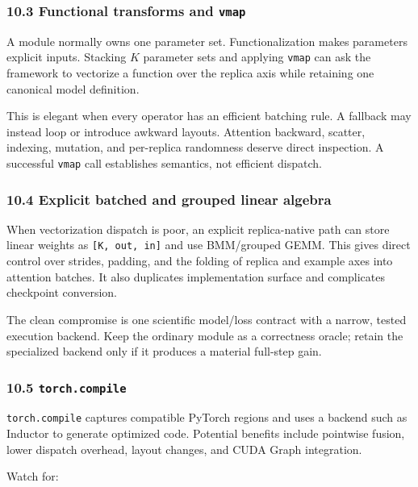 \documentclass[
  10pt,
  letterpaper,
]{article}
\begin{document}
\subsubsection{\texorpdfstring{10.3 Functional transforms and
\texttt{vmap}}{10.3 Functional transforms and vmap}}\label{103-functional-transforms-and-vmap}

A module normally owns one parameter set. Functionalization makes
parameters explicit inputs. Stacking \(K\) parameter sets and applying
\texttt{vmap} can ask the framework to vectorize a function over the
replica axis while retaining one canonical model definition.

This is elegant when every operator has an efficient batching rule. A
fallback may instead loop or introduce awkward layouts. Attention
backward, scatter, indexing, mutation, and per-replica randomness
deserve direct inspection. A successful \texttt{vmap} call establishes
semantics, not efficient dispatch.

\subsubsection{10.4 Explicit batched and grouped linear
algebra}\label{104-explicit-batched-and-grouped-linear-algebra}

When vectorization dispatch is poor, an explicit replica-native path can
store linear weights as \texttt{{[}K,\ out,\ in{]}} and use BMM/grouped
GEMM. This gives direct control over strides, padding, and the folding
of replica and example axes into attention batches. It also duplicates
implementation surface and complicates checkpoint conversion.

The clean compromise is one scientific model/loss contract with a
narrow, tested execution backend. Keep the ordinary module as a
correctness oracle; retain the specialized backend only if it produces a
material full-step gain.

\subsubsection{\texorpdfstring{10.5
\texttt{torch.compile}}{10.5 torch.compile}}\label{105-torchcompile}

\texttt{torch.compile} captures compatible PyTorch regions and uses a
backend such as Inductor to generate optimized code. Potential benefits
include pointwise fusion, lower dispatch overhead, layout changes, and
CUDA Graph integration.

Watch for:
\end{document}
